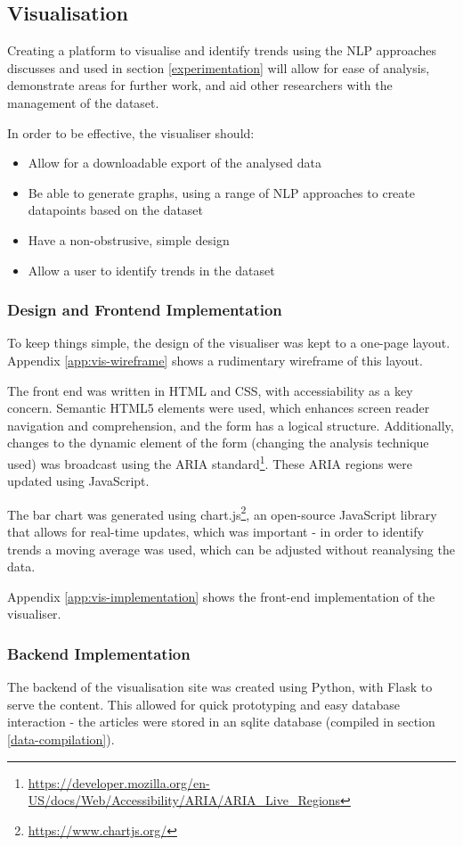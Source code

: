 \subsection{Visualisation}

Creating a platform to visualise and identify trends using the NLP approaches discusses and used in section \ref{experimentation} will allow for ease of analysis, demonstrate areas for further work, and aid other researchers with the management of the dataset.

In order to be effective, the visualiser should:
\begin{itemize}
	\item Allow for a downloadable export of the analysed data
	\item Be able to generate graphs, using a range of NLP approaches to create datapoints based on the dataset
	\item Have a non-obstrusive, simple design	
	\item Allow a user to identify trends in the dataset
\end{itemize}


\subsubsection{Design and Frontend Implementation}
To keep things simple, the design of the visualiser was kept to a one-page layout. Appendix \ref{app:vis-wireframe} shows a rudimentary wireframe of this layout. 

The front end was written in HTML and CSS, with accessiability as a key concern. Semantic HTML5 elements were used, which enhances screen reader navigation and comprehension, and the form has a logical structure. Additionally, changes to the dynamic element of the form (changing the analysis technique used) was broadcast using the ARIA standard\footnote{\url{https://developer.mozilla.org/en-US/docs/Web/Accessibility/ARIA/ARIA_Live_Regions}}. These ARIA regions were updated using JavaScript.

The bar chart was generated using chart.js\footnote{\url{https://www.chartjs.org/}}, an open-source JavaScript library that allows for real-time updates, which was important - in order to identify trends a moving average was used, which can be adjusted without reanalysing the data.

Appendix \ref{app:vis-implementation} shows the front-end implementation of the visualiser.


\subsubsection{Backend Implementation}
The backend of the visualisation site was created using Python, with Flask to serve the content. This allowed for quick prototyping and easy database interaction - the articles were stored in an sqlite database (compiled in section \ref{data-compilation}).

